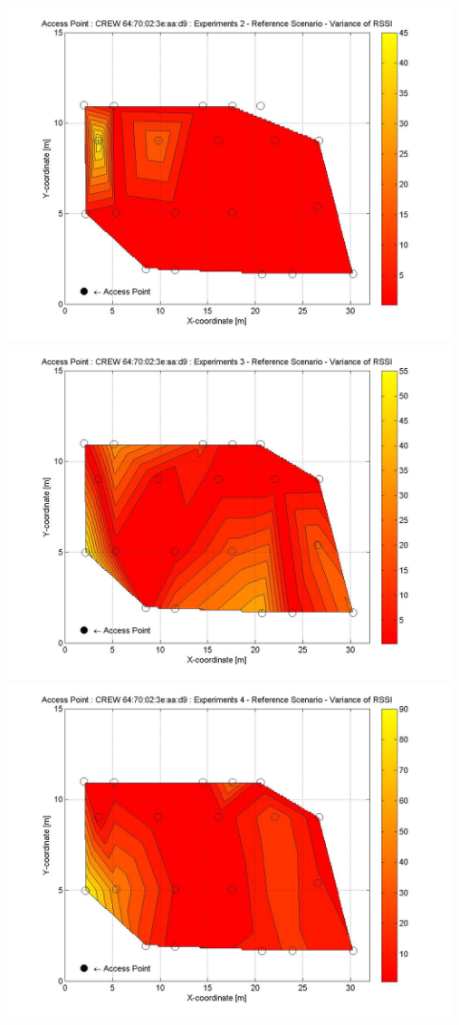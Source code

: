 \documentclass[11pt,a4paper,headinclude,footinclude,chapterprefix=on]{scrreprt}
\begin{document}
\begin{longtable}
	\includegraphics[width=13cm]{../../Source/plot/CREW_d9/d9_Ref_Ex_2_Variance.jpg} \\
	\includegraphics[width=13cm]{../../Source/plot/CREW_d9/d9_Ref_Ex_3_Variance.jpg} \\
	\includegraphics[width=13cm]{../../Source/plot/CREW_d9/d9_Ref_Ex_4_Variance.jpg} 
\end{longtable}
\end{document}
